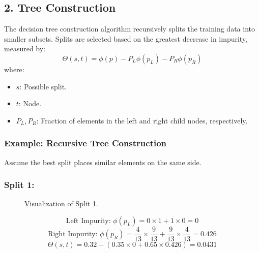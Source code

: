 \documentclass{article}
\begin{document}
\subsection*{2. Tree Construction}
The decision tree construction algorithm recursively splits the training data into smaller subsets. Splits are selected based on the greatest decrease in impurity, measured by:
\[
\Theta(s, t) = \phi(p) - P_L \phi(p_L) - P_R \phi(p_R)
\]
where:
\begin{itemize}
    \item \( s \): Possible split.
    \item \( t \): Node.
    \item \( P_L, P_R \): Fraction of elements in the left and right child nodes, respectively.
\end{itemize}

\subsubsection*{Example: Recursive Tree Construction}
Assume the best split places similar elements on the same side.

\subsubsection*{Split 1:}
\begin{figure}[h]
    \centering
    \caption{Visualization of Split 1.}
\end{figure}

\[
\text{Left Impurity: } \phi(p_L) = 0 \times 1 + 1 \times 0 = 0
\]
\[
\text{Right Impurity: } \phi(p_R) = \frac{4}{13} \times \frac{9}{13} + \frac{9}{13} \times \frac{4}{13} = 0.426
\]
\[
\Theta(s, t) = 0.32 - (0.35 \times 0 + 0.65 \times 0.426) = 0.0431
\]
\end{document}

